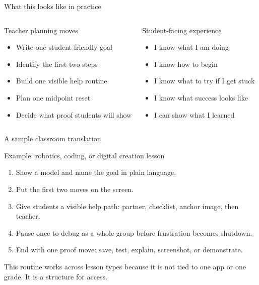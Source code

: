 \documentclass[aspectratio=169,11pt]{beamer}
\begin{document}
\begin{frame}{What this looks like in practice}
\begin{columns}[T]
  \begin{block}{Teacher planning moves}
  \begin{itemize}
    \item Write one student-friendly goal
    \item Identify the first two steps
    \item Build one visible help routine
    \item Plan one midpoint reset
    \item Decide what proof students will show
  \end{itemize}
  \end{block}

  \begin{block}{Student-facing experience}
  \begin{itemize}
    \item I know what I am doing
    \item I know how to begin
    \item I know what to try if I get stuck
    \item I know what success looks like
    \item I can show what I learned
  \end{itemize}
  \end{block}
\end{columns}
\end{frame}

\begin{frame}{A sample classroom translation}
\begin{block}{Example: robotics, coding, or digital creation lesson}
\begin{enumerate}
  \item Show a model and name the goal in plain language.
  \item Put the first two moves on the screen.
  \item Give students a visible help path: partner, checklist, anchor image, then teacher.
  \item Pause once to debug as a whole group before frustration becomes shutdown.
  \item End with one proof move: save, test, explain, screenshot, or demonstrate.
  \end{enumerate}
\end{block}

\vspace{0.15cm}
This routine works across lesson types because it is not tied to one app or one grade. It is a structure for access.
\end{frame}
\end{document}
